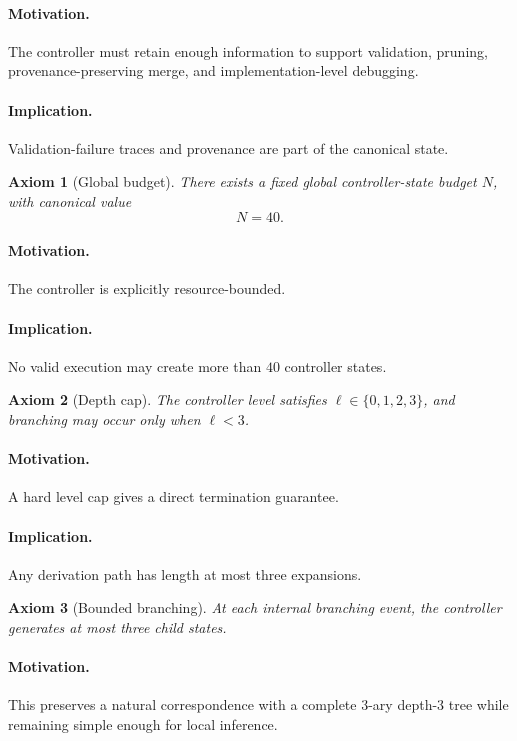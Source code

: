 \documentclass[11pt,a4paper]{article}
\numberwithin{equation}{section}
\newtheorem{axiom}{Axiom}[section]
\theoremstyle{definition}
\begin{document}
\paragraph{Motivation.}
The controller must retain enough information to support validation, pruning, provenance-preserving merge, and implementation-level debugging.

\paragraph{Implication.}
Validation-failure traces and provenance are part of the canonical state.

\begin{axiom}[Global budget]
There exists a fixed global controller-state budget \(N\), with canonical value
\[
N=40.
\]
\end{axiom}

\paragraph{Motivation.}
The controller is explicitly resource-bounded.

\paragraph{Implication.}
No valid execution may create more than \(40\) controller states.

\begin{axiom}[Depth cap]
The controller level satisfies \(\ell\in\{0,1,2,3\}\), and branching may occur only when \(\ell<3\).
\end{axiom}

\paragraph{Motivation.}
A hard level cap gives a direct termination guarantee.

\paragraph{Implication.}
Any derivation path has length at most three expansions.

\begin{axiom}[Bounded branching]
At each internal branching event, the controller generates at most three child states.
\end{axiom}

\paragraph{Motivation.}
This preserves a natural correspondence with a complete \(3\)-ary depth-\(3\) tree while remaining simple enough for local inference.
\end{document}
